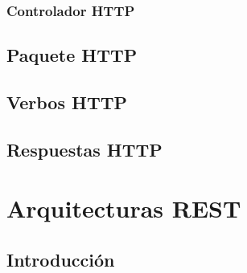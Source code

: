 \documentclass[a4paper,slidestop,xcolor=pst,blue]{beamer}
\begin{document}
\begin{frame}
    \frametitle{Controlador HTTP}
\end{frame}

\subsection{Paquete HTTP}

\subsection{Verbos HTTP}

\subsection{Respuestas HTTP}

\section{Arquitecturas REST}

\subsection{Introducción}
\end{document}
